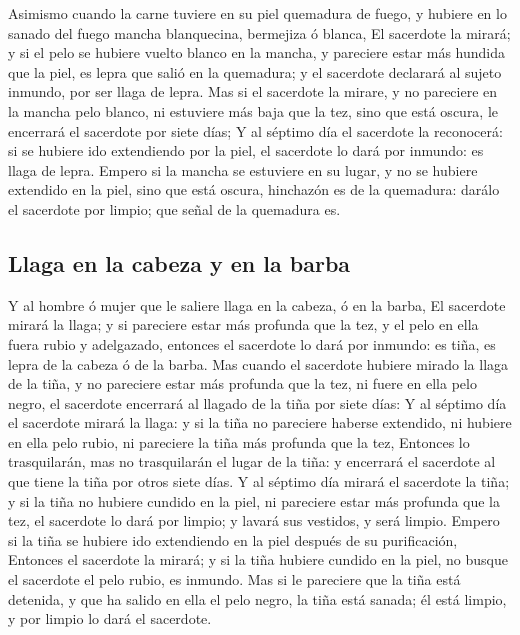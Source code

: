  Asimismo cuando la carne tuviere en su piel quemadura de
fuego, y hubiere en lo sanado del fuego mancha blanquecina, bermejiza ó
blanca,  El sacerdote la mirará; y si el pelo se hubiere
vuelto blanco en la mancha, y pareciere estar más hundida que la piel,
es lepra que salió en la quemadura; y el sacerdote declarará al sujeto
inmundo, por ser llaga de lepra.  Mas si el sacerdote la
mirare, y no pareciere en la mancha pelo blanco, ni estuviere más baja
que la tez, sino que está oscura, le encerrará el sacerdote por siete
días;  Y al séptimo día el sacerdote la reconocerá: si se
hubiere ido extendiendo por la piel, el sacerdote lo dará por inmundo:
es llaga de lepra.  Empero si la mancha se estuviere en
su lugar, y no se hubiere extendido en la piel, sino que está oscura,
hinchazón es de la quemadura: darálo el sacerdote por limpio; que señal
de la quemadura es.

\hypertarget{llaga-en-la-cabeza-y-en-la-barba}{%
\subsection{Llaga en la cabeza y en la
barba}\label{llaga-en-la-cabeza-y-en-la-barba}}

 Y al hombre ó mujer que le saliere llaga en la cabeza, ó
en la barba,  El sacerdote mirará la llaga; y si
pareciere estar más profunda que la tez, y el pelo en ella fuera rubio y
adelgazado, entonces el sacerdote lo dará por inmundo: es tiña, es lepra
de la cabeza ó de la barba.  Mas cuando el sacerdote
hubiere mirado la llaga de la tiña, y no pareciere estar más profunda
que la tez, ni fuere en ella pelo negro, el sacerdote encerrará al
llagado de la tiña por siete días:  Y al séptimo día el
sacerdote mirará la llaga: y si la tiña no pareciere haberse extendido,
ni hubiere en ella pelo rubio, ni pareciere la tiña más profunda que la
tez,  Entonces lo trasquilarán, mas no trasquilarán el
lugar de la tiña: y encerrará el sacerdote al que tiene la tiña por
otros siete días.  Y al séptimo día mirará el sacerdote
la tiña; y si la tiña no hubiere cundido en la piel, ni pareciere estar
más profunda que la tez, el sacerdote lo dará por limpio; y lavará sus
vestidos, y será limpio.  Empero si la tiña se hubiere
ido extendiendo en la piel después de su purificación, 
Entonces el sacerdote la mirará; y si la tiña hubiere cundido en la
piel, no busque el sacerdote el pelo rubio, es inmundo. 
Mas si le pareciere que la tiña está detenida, y que ha salido en ella
el pelo negro, la tiña está sanada; él está limpio, y por limpio lo dará
el sacerdote.

